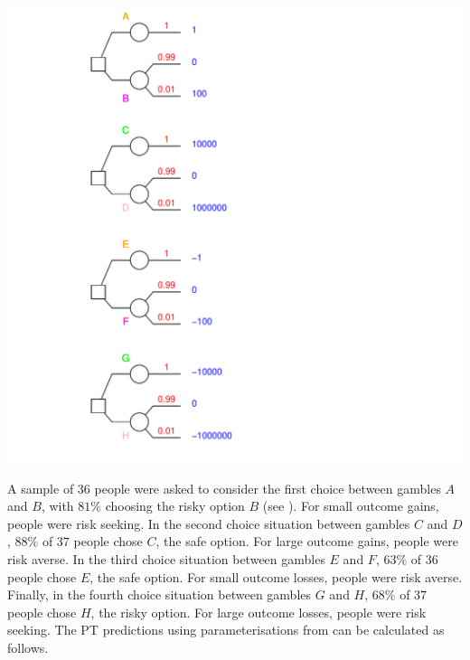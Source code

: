 \documentclass{article}\usepackage[]{graphicx}\usepackage[]{color}
\newenvironment{knitrout}{}{} %
\begin{document}
\begin{knitrout}
{\centering \includegraphics[width=0.8\linewidth]{figure/unnamed-chunk-34} 

}



\end{knitrout}


A sample of $36$ people were asked to consider the first choice between gambles $A$ and $B$, with
$81\%$ choosing the risky option $B$ (see \cite[][p. 406 Table 3, Experiment 1, Question 13]{Hershey_Schoemaker_1980}). For small outcome gains, people were risk seeking.
In the second choice situation between gambles $C$ and $D$, $88\%$ of $37$ people chose $C$, the safe
option. For large outcome gains, people were risk averse.
In the third choice situation between gambles $E$ and $F$, $63\%$ of $36$ people chose $E$, the safe
option. For small outcome losses, people were risk averse.
Finally, in the fourth choice situation between gambles $G$ and $H$, $68\%$ of $37$ people chose $H$, the risky option. For large outcome losses, people were risk seeking.
The PT predictions using parameterisations from \citet[][]{Scholten_Read_2014} can be calculated as follows.
\end{document}
